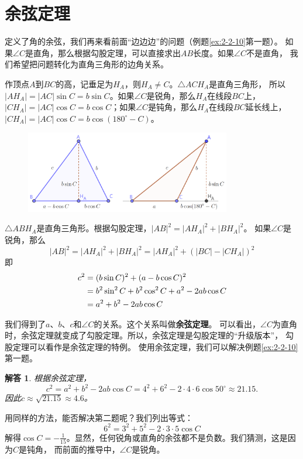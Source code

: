 \documentclass[12pt,UTF8]{ctexbook}
\newtheorem*{so}{解答}
\begin{document}
\section{余弦定理}

定义了角的余弦，我们再来看前面“边边边”的问题（例题\ref{ex:2-2-10}第一题）。
如果$\angle C$是直角，那么根据勾股定理，可以直接求出$AB$长度。如果$\angle C$不是直角，
我们希望把问题转化为直角三角形的边角关系。

作顶点$A$到$BC$的高，记垂足为$H_A$，则$H_A \neq C$。$\triangle ACH_A$是直角三角形，
所以$|AH_A| = |AC|\sin C = b\sin C$。如果$\angle C$是锐角，那么$H_A$在线段$BC$上，
$|CH_A| = |AC|\cos C = b\cos C$；如果$\angle C$是钝角，那么$H_A$在线段$BC$延长线上，
$|CH_A| = |AC|\cos C = b\cos (180^\circ - C)$。

\begin{figure}[H] %
    \vspace{4pt}
    \centering
    \includegraphics[width=0.8\textwidth]{余弦定理1.png}
\end{figure}

$\triangle ABH_A$是直角三角形。根据勾股定理，$|AB|^2 = |AH_A|^2 + |BH_A|^2 $。
如果$\angle C$是锐角，那么
$$ |AB|^2 = |AH_A|^2 + |BH_A|^2 = |AH_A|^2 + (|BC| - |CH_A|)^2$$
即
\begin{align}
    c^2 &= (b\sin C)^2 + (a - b\cos C)^2 \notag \\
    &= b^2\sin^2 C + b^2\cos^2 C + a^2 - 2ab\cos C \notag \\
    &= a^2 + b^2 - 2ab\cos C \notag
\end{align}

我们得到了$a$、$b$、$c$和$\angle C$的关系。这个关系叫做\textbf{余弦定理}。
可以看出，$\angle C$为直角时，余弦定理就变成了勾股定理。所以，余弦定理是勾股定理的“升级版本”，
勾股定理可以看作是余弦定理的特例。
使用余弦定理，我们可以解决例题\ref{ex:2-2-10}第一题。
\begin{so}
    根据余弦定理，
    $$c^2 = a^2 + b^2 - 2ab \cos C = 4^2 + 6^2 - 2\cdot 4\cdot 6 \cos 50^\circ \approx 21.15.$$
    因此$c \approx \sqrt{21.15} \approx 4.6$。
\end{so}
用同样的方法，能否解决第二题呢？我们列出等式：
$$6^2 = 3^2 + 5^2 - 2 \cdot 3\cdot 5 \cos C $$
解得$\cos C = -\frac{1}{15}$。显然，任何锐角或直角的余弦都不是负数。我们猜测，这是因为$C$是钝角，
而前面的推导中，$\angle C$是锐角。
\end{document}
